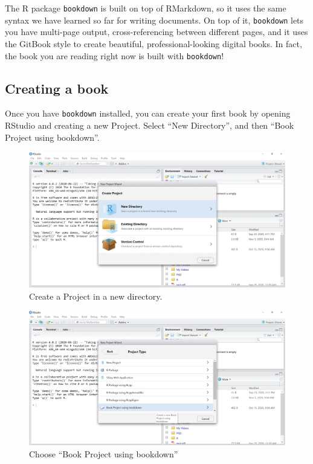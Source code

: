 \documentclass[
]{book}
\begin{document}
The R package \texttt{bookdown} is built on top of RMarkdown, so it uses the same syntax we have learned so far for writing documents. On top of it, \texttt{bookdown} lets you have multi-page output, cross-referencing between different pages, and it uses the GitBook style to create beautiful, professional-looking digital books. In fact, the book you are reading right now is built with \texttt{bookdown}!

\hypertarget{creating-a-book}{%
\subsection{Creating a book}\label{creating-a-book}}

Once you have \texttt{bookdown} installed, you can create your first book by opening RStudio and creating a new Project. Select ``New Directory'', and then ``Book Project using bookdown''.

\begin{figure}
\centering
\includegraphics{img/create-project-in-new-directory.jpg}
\caption{Create a Project in a new directory.}
\end{figure}

\begin{figure}
\centering
\includegraphics{img/book-project-using-bookdown.jpg}
\caption{Choose ``Book Project using bookdown''}
\end{figure}
\end{document}

